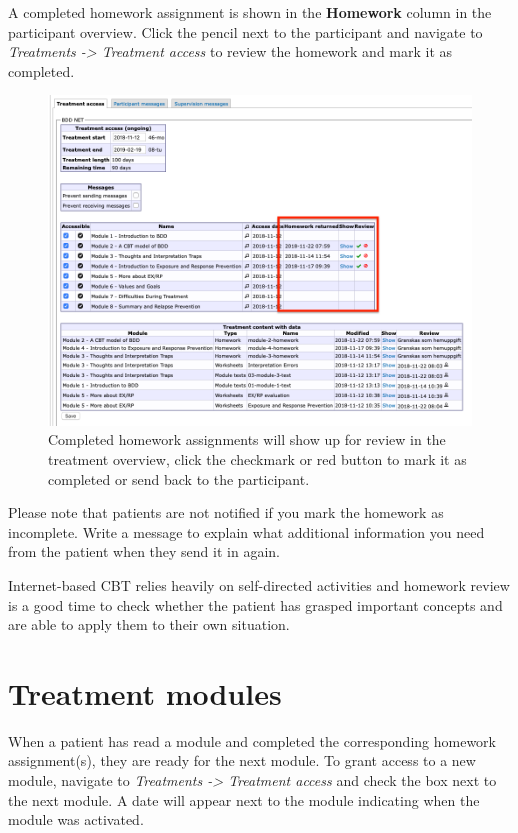 \documentclass[]{book}
\begin{document}
A completed homework assignment is shown in the \textbf{Homework} column in the participant overview. Click the pencil next to the participant and navigate to \emph{Treatments -\textgreater{} Treatment access} to review the homework and mark it as completed.

\begin{figure}
\centering
\includegraphics{images/homework-complete.png}
\caption{Completed homework assignments will show up for review in the treatment overview, click the checkmark or red button to mark it as completed or send back to the participant.}
\end{figure}

Please note that patients are not notified if you mark the homework as incomplete. Write a message to explain what additional information you need from the patient when they send it in again.

Internet-based CBT relies heavily on self-directed activities and homework review is a good time to check whether the patient has grasped important concepts and are able to apply them to their own situation.

\hypertarget{treatment-modules}{%
\section{Treatment modules}\label{treatment-modules}}

When a patient has read a module and completed the corresponding homework assignment(s), they are ready for the next module. To grant access to a new module, navigate to \emph{Treatments -\textgreater{} Treatment access} and check the box next to the next module. A date will appear next to the module indicating when the module was activated.
\end{document}
